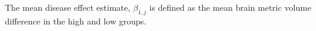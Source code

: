 The mean disease effect estimate, $\beta_{1,j}$ is defined as the mean brain metric volume difference in the high and low groups.